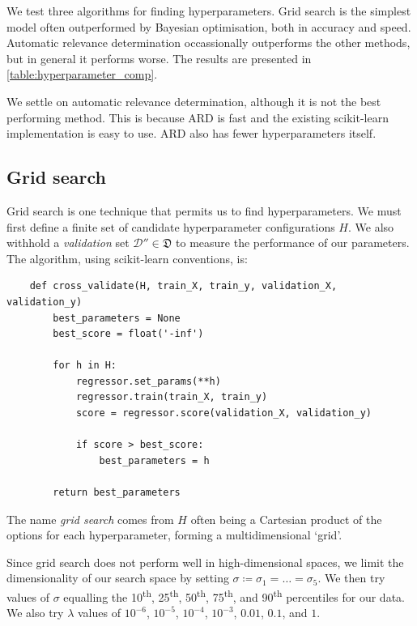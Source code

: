 \documentclass[11pt,twoside,openright]{report}
\newcommand\cD{\mathcal{D}}
\newcommand\fD{\mathfrak{D}}
\begin{document}
We test three algorithms for finding hyperparameters. Grid search is the simplest model often outperformed by Bayesian optimisation, both in accuracy and speed. Automatic relevance determination occassionally outperforms the other methods, but in general it performs worse. The results are presented in \cref{table:hyperparameter_comp}.

We settle on automatic relevance determination, although it is not the best performing method. This is because ARD is fast and the existing scikit-learn implementation is easy to use. ARD also has fewer hyperparameters itself.

  \subsection{Grid search}

  Grid search is one technique that permits us to find hyperparameters. We must first define a finite set of candidate hyperparameter configurations $H$. We also withhold a \emph{validation} set $\cD'' \in \fD$ to measure the performance of our parameters. The algorithm, using scikit-learn \citep{Sklearn} conventions, is:
  \begin{verbatim}
    def cross_validate(H, train_X, train_y, validation_X, validation_y)
        best_parameters = None
        best_score = float('-inf')

        for h in H:
            regressor.set_params(**h)
            regressor.train(train_X, train_y)
            score = regressor.score(validation_X, validation_y)

            if score > best_score:
                best_parameters = h

        return best_parameters
  \end{verbatim}

  The name \emph{grid search} comes from $H$ often being a Cartesian product of the options for each hyperparameter, forming a multidimensional `grid'.

  Since grid search does not perform well in high-dimensional spaces, we limit the dimensionality of our search space by setting $\sigma \coloneqq \sigma_1 = \dots = \sigma_5$. We then try values of $\sigma$ equalling the 10\textsuperscript{th}, 25\textsuperscript{th}, 50\textsuperscript{th}, 75\textsuperscript{th}, and 90\textsuperscript{th} percentiles for our data. We also try $\lambda$ values of $10^{-6}$, $10^{-5}$, $10^{-4}$, $10^{-3}$, $0.01$, $0.1$, and $1$.
\end{document}
